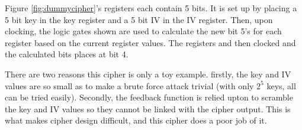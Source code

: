 \documentclass{report}
\begin{document}
Figure \ref{fig:dummycipher}'s registers each contain 5 bits. It is set up by placing a 5 bit key in the key register and a 5 bit IV in the IV register. Then, upon clocking, the logic gates shown are used to calculate the new bit 5's for each register based on the current register values. The registers and then clocked and the calculated bits places at bit 4.

There are two reasons this cipher is only a toy example. firstly, the key and IV values are so small as to make a brute force attack trivial (with only $2^5$ keys, all can be tried easily). Secondly, the feedback function is relied upton to scramble the key and IV values so they cannot be linked with the cipher output. This is what makes cipher design difficult, and this cipher does a poor job of it.

\begin{figure}[h]
\end{figure}
\end{document}
